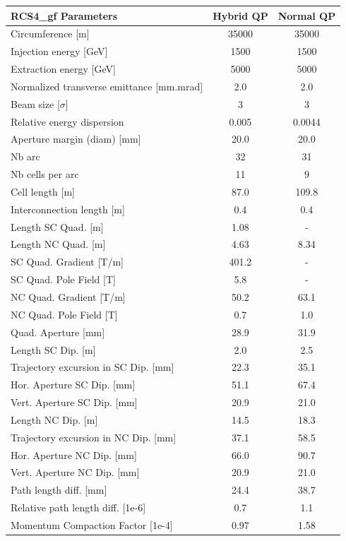\begin{tabular}{lcc}
\toprule
RCS4_gf Parameters & Hybrid QP & Normal QP \\
\midrule
Circumference [m] & 35000 & 35000 \\
Injection energy [GeV] & 1500 & 1500 \\
Extraction energy [GeV] & 5000 & 5000 \\
Normalized transverse emittance [mm.mrad] & 2.0 & 2.0 \\
Beam size [$\sigma$] & 3 & 3 \\
Relative energy dispersion & 0.005 & 0.0044 \\
Aperture margin (diam) [mm] & 20.0 & 20.0 \\
Nb arc & 32 & 31 \\
Nb cells per arc & 11 & 9 \\
Cell length [m] & 87.0 & 109.8 \\
Interconnection length [m] & 0.4 & 0.4 \\
Length SC Quad. [m] & 1.08 & - \\
Length NC Quad. [m] & 4.63 & 8.34 \\
SC Quad. Gradient [T/m] & 401.2 & - \\
SC Quad. Pole Field [T] & 5.8 & - \\
NC Quad. Gradient [T/m] & 50.2 & 63.1 \\
NC Quad. Pole Field [T] & 0.7 & 1.0 \\
Quad. Aperture [mm] & 28.9 & 31.9 \\
Length SC Dip. [m] & 2.0 & 2.5 \\
Trajectory excursion in SC Dip. [mm] & 22.3 & 35.1 \\
Hor. Aperture SC Dip. [mm] & 51.1 & 67.4 \\
Vert. Aperture SC Dip. [mm] & 20.9 & 21.0 \\
Length NC Dip. [m] & 14.5 & 18.3 \\
Trajectory excursion in NC Dip. [mm] & 37.1 & 58.5 \\
Hor. Aperture NC Dip. [mm] & 66.0 & 90.7 \\
Vert. Aperture NC Dip. [mm] & 20.9 & 21.0 \\
Path length diff. [mm] & 24.4 & 38.7 \\
Relative path length diff. [1e-6] & 0.7 & 1.1 \\
Momentum Compaction Factor [1e-4] & 0.97 & 1.58 \\
\bottomrule
\end{tabular}
